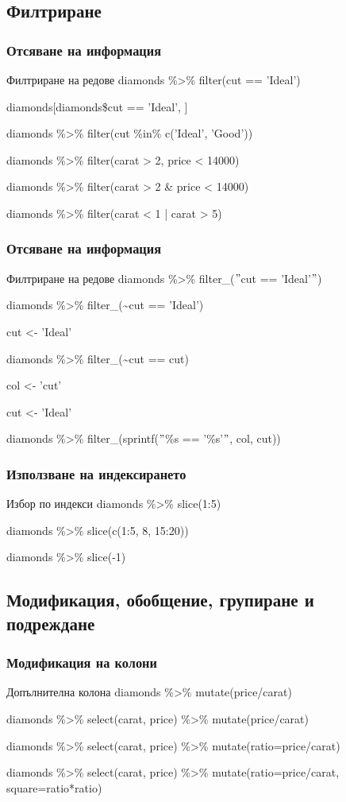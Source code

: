 \documentclass{beamer}
\begin{document}
\subsection{Филтриране}

\begin{frame}
\frametitle{Отсяване на информация}
\begin{block}{Филтриране на редове}
diamonds \%>\% filter(cut == 'Ideal')

diamonds[diamonds\$cut == 'Ideal', ]

diamonds \%>\% filter(cut \%in\% c('Ideal', 'Good'))

diamonds \%>\% filter(carat > 2, price < 14000)

diamonds \%>\% filter(carat > 2 \& price < 14000)

diamonds \%>\% filter(carat < 1 | carat > 5)
\end{block}
\end{frame}

\begin{frame}
\frametitle{Отсяване на информация}
\begin{block}{Филтриране на редове}
diamonds \%>\% filter\_($"$cut == 'Ideal'$"$)

diamonds \%>\% filter\_(\textasciitilde cut == 'Ideal')

cut <- 'Ideal'

diamonds \%>\% filter\_(\textasciitilde cut == cut)

col <- 'cut'

cut <- 'Ideal'

diamonds \%>\% filter\_(sprintf($"$\%s == '\%s'$"$, col, cut))
\end{block}
\end{frame}

\begin{frame}
\frametitle{Използване на индексирането}
\begin{block}{Избор по индекси}
diamonds \%>\% slice(1:5)

diamonds \%>\% slice(c(1:5, 8, 15:20))

diamonds \%>\% slice(-1)
\end{block}
\end{frame}

\subsection{Модификация, обобщение, групиране и подреждане}

\begin{frame}
\frametitle{Модификация на колони}
\begin{block}{Допълнителна колона}
diamonds \%>\% mutate(price/carat)

diamonds \%>\% select(carat, price) \%>\% mutate(price/carat)

diamonds \%>\% select(carat, price) \%>\% mutate(ratio=price/carat)

diamonds \%>\% select(carat, price) \%>\% mutate(ratio=price/carat, square=ratio*ratio)
\end{block}
\end{frame}
\end{document}
